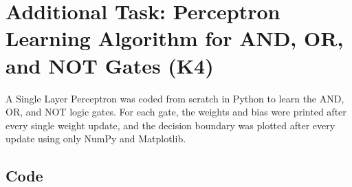 %

\section*{Additional Task: Perceptron Learning Algorithm for AND, OR, and NOT Gates (K4)}

A Single Layer Perceptron was coded from scratch in Python to learn the AND, OR, and NOT logic
gates. For each gate, the weights and bias were printed after every single weight update, and the
decision boundary was plotted after every update using only NumPy and Matplotlib.

\subsection*{Code}


